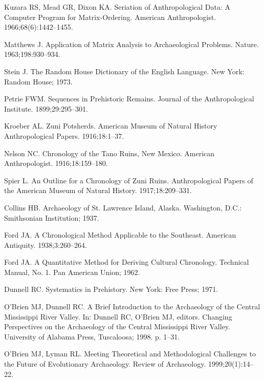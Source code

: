 \documentclass[10pt,letterpaper]{article}
\begin{document}
\begin{thebibliography}{10}
Kuzara RS, Mead GR, Dixon KA.
\newblock Seriation of Anthropological Data: A Computer Program for
  Matrix-Ordering.
\newblock American Anthropologist. 1966;68(6):1442--1455.

Matthews J.
\newblock Application of Matrix Analysis to Archaeological Problems.
\newblock Nature. 1963;198:930--934.

Stein J.
\newblock The Random House Dictionary of the English Language.
\newblock New York: Random House; 1973.

Petrie FWM.
\newblock Sequences in Prehistoric Remains.
\newblock Journal of the Anthropological Institute. 1899;29:295--301.

Kroeber AL.
\newblock Zuni Potsherds.
\newblock American Museum of Natural History Anthropological Papers.
  1916;18:1--37.

Nelson NC.
\newblock Chronology of the Tano Ruins, New Mexico.
\newblock American Anthropologist. 1916;18:159--180.

Spier L.
\newblock An Outline for a Chronology of Zuni Ruins.
\newblock Anthropological Papers of the American Museum of Natural History.
  1917;18:209--331.

Collins HB.
\newblock Archaeology of St. Lawrence Island, Alaska.
\newblock Washington, D.C.: Smithsonian Institution; 1937.

Ford JA.
\newblock A Chronological Method Applicable to the Southeast.
\newblock American Antiquity. 1938;3:260--264.

Ford JA.
\newblock A Quantitative Method for Deriving Cultural Chronology.
\newblock Technical Manual, No. 1. Pan American Union; 1962.

Dunnell RC.
\newblock Systematics in Prehistory.
\newblock New York: Free Press; 1971.

O'Brien MJ, Dunnell RC.
\newblock A Brief Introduction to the Archaeology of the Central Mississippi
  River Valley.
\newblock In: Dunnell RC, O'Brien MJ, editors. Changing Perspectives on the
  Archaeology of the Central Mississippi River Valley. University of Alabama
  Press, Tuscaloosa; 1998. p. 1--31.

O'Brien MJ, Lyman RL.
\newblock Meeting Theoretical and Methodological Challenges to the Future of
  Evolutionary Archaeology.
\newblock Review of Archaeology. 1999;20(1):14--22.


\end{thebibliography}
\end{document}
